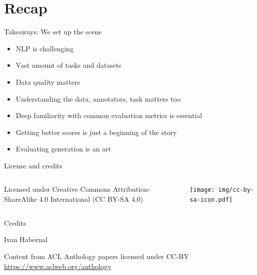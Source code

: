 \documentclass[12pt,aspectratio=169,handout]{beamer}
\begin{document}
\section*{Recap}

\begin{frame}{Takeaways: We set up the scene}
	
\begin{itemize}
	\item NLP is challenging
	\item Vast amount of tasks and datasets
	\item Data quality matters
	\item Understanding the data, annotators, task matters too
	\item Deep familiarity with common evaluation metrics is essential
	\item Getting better scores is just a beginning of the story
	\item Evaluating generation is an art
\end{itemize}
	
\end{frame}



\begin{frame}{License and credits}

	\begin{columns}
		\begin{column}{0.7\textwidth}
			Licensed under Creative Commons Attribution-ShareAlike 4.0 International (CC BY-SA 4.0)
		\end{column}
		\begin{column}{0.2\textwidth}
			\texttt{[image: img/cc-by-sa-icon.pdf]}
		\end{column}
	\end{columns}
	
	\bigskip
	
	Credits
	
	\begin{scriptsize}
		
		Ivan Habernal
		
		Content from ACL Anthology papers licensed under CC-BY \url{https://www.aclweb.org/anthology}
		
	\end{scriptsize}
	
\end{frame}
\end{document}
